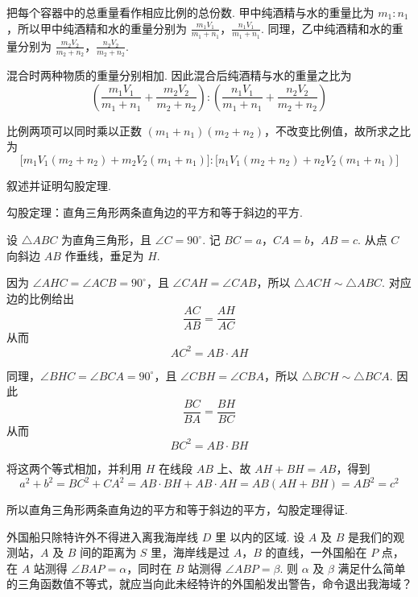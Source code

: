 \documentclass[UTF8,a4paper,oneside,11pt]{ctexbook}
\begin{document}
\begin{solution}
把每个容器中的总重量看作相应比例的总份数. 甲中纯酒精与水的重量比为 \(m_1:n_1\)，所以甲中纯酒精和水的重量分别为
\(\frac{m_1V_1}{m_1+n_1}\)，\(\frac{n_1V_1}{m_1+n_1}\).
同理，乙中纯酒精和水的重量分别为
\(\frac{m_2V_2}{m_2+n_2}\)，\(\frac{n_2V_2}{m_2+n_2}\).

混合时两种物质的重量分别相加. 因此混合后纯酒精与水的重量之比为
\[
\left(\frac{m_{1}V_{1}}{m_{1}+n_{1}}+\frac{m_{2}V_{2}}{m_{2}+n_{2}}\right):\left(\frac{n_{1}V_{1}}{m_{1}+n_{1}}+\frac{n_{2}V_{2}}{m_{2}+n_{2}}\right)
\]

比例两项可以同时乘以正数 \(\left(m_1+n_1\right)\left(m_2+n_2\right)\)，不改变比例值，故所求之比为
\[
\bigl[m_{1}V_{1}(m_{2}+n_{2})+m_{2}V_{2}(m_{1}+n_{1})\bigr]:\bigl[n_{1}V_{1}(m_{2}+n_{2})+n_{2}V_{2}(m_{1}+n_{1})\bigr]
\]
\end{solution}

\begin{problem}
叙述并证明勾股定理.
\end{problem}

\begin{solution}
勾股定理：直角三角形两条直角边的平方和等于斜边的平方.

设 \(\triangle ABC\) 为直角三角形，且 \(\angle C=90^{\circ}\). 记
\(BC=a\)，\(CA=b\)，\(AB=c\).
从点 \(C\) 向斜边 \(AB\) 作垂线，垂足为 \(H\).

因为 \(\angle AHC=\angle ACB=90^{\circ}\)，且 \(\angle CAH=\angle CAB\)，所以
\(
 \triangle ACH\sim\triangle ABC
\).
对应边的比例给出
\[
\frac{AC}{AB}=\frac{AH}{AC}
\]
从而
\[
AC^2=AB\cdot AH
\]

同理，\(\angle BHC=\angle BCA=90^{\circ}\)，且 \(\angle CBH=\angle CBA\)，所以
\(\triangle BCH\sim\triangle BCA\).
因此
\[
\frac{BC}{BA}=\frac{BH}{BC}
\]
从而
\[
BC^2=AB\cdot BH
\]

将这两个等式相加，并利用 \(H\) 在线段 \(AB\) 上、故 \(AH+BH=AB\)，得到
\[
a^{2}+b^{2}=BC^{2}+CA^{2}=AB\cdot BH+AB\cdot AH=AB\left(AH+BH\right)=AB^{2}=c^{2}
\]

所以直角三角形两条直角边的平方和等于斜边的平方，勾股定理得证.
\end{solution}

\begin{problem}
外国船只除特许外不得进入离我海岸线 \(D\text{ 里}\) 以内的区域. 设 \(A\) 及 \(B\) 是我们的观测站，\(A\) 及 \(B\) 间的距离为 \(S\text{ 里}\)，海岸线是过 \(A\)，\(B\) 的直线，一外国船在 \(P\) 点，在 \(A\) 站测得 \(\angle BAP=\alpha\)，同时在 \(B\) 站测得 \(\angle ABP=\beta\). 则 \(\alpha\) 及 \(\beta\) 满足什么简单的三角函数值不等式，就应当向此未经特许的外国船发出警告，命令退出我海域？
\end{problem}
\end{document}
